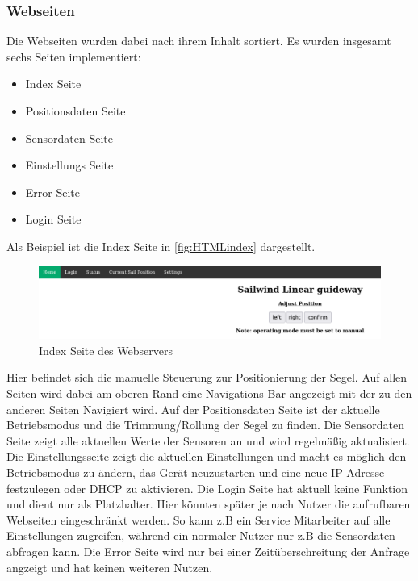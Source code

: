 \subsubsection{Webseiten}
Die Webseiten wurden dabei nach ihrem Inhalt sortiert. Es wurden insgesamt sechs Seiten implementiert:
\begin{itemize}
	\item Index Seite
	\item Positionsdaten Seite
	\item Sensordaten Seite
	\item Einstellungs Seite
	\item Error Seite
	\item Login Seite
\end{itemize}
Als Beispiel ist die Index Seite in \autoref{fig:HTMLindex} dargestellt.
\begin{figure}[H]
	\centering
	\includegraphics[width=\linewidth]{images/Software/Html_index_seite.png}
	\caption{Index Seite des Webservers}
	\label{fig:HTMLindex}
\end{figure}
\noindent Hier befindet sich die manuelle Steuerung zur Positionierung der Segel. Auf allen Seiten wird dabei am oberen Rand eine Navigations Bar angezeigt mit der zu den anderen Seiten Navigiert wird. Auf der Positionsdaten Seite ist der aktuelle Betriebsmodus und die Trimmung/Rollung der Segel zu finden. Die Sensordaten Seite zeigt alle aktuellen Werte der Sensoren an und wird regelmäßig aktualisiert. Die Einstellungsseite zeigt die aktuellen Einstellungen und macht es möglich den Betriebsmodus zu ändern, das Gerät neuzustarten und eine neue IP Adresse festzulegen oder \ac{DHCP} zu aktivieren. Die Login Seite hat aktuell keine Funktion und dient nur als Platzhalter. Hier könnten später je nach Nutzer die aufrufbaren Webseiten eingeschränkt werden. So kann z.B ein Service Mitarbeiter auf alle Einstellungen zugreifen, während ein normaler Nutzer nur z.B die Sensordaten abfragen kann. Die Error Seite wird nur bei einer Zeitüberschreitung der Anfrage angzeigt und hat keinen weiteren Nutzen.
